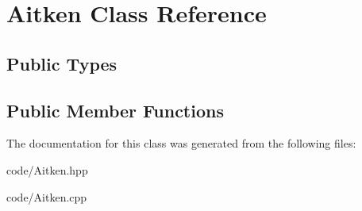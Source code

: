 \hypertarget{class_aitken}{}\section{Aitken Class Reference}
\label{class_aitken}
\subsection*{Public Types}
\begin{DoxyCompactItemize}
\end{DoxyCompactItemize}
\subsection*{Public Member Functions}
\begin{DoxyCompactItemize}
\end{DoxyCompactItemize}


The documentation for this class was generated from the following files\+:\begin{DoxyCompactItemize}
\item 
code/Aitken.\+hpp\item 
code/Aitken.\+cpp\end{DoxyCompactItemize}
